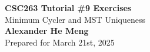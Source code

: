 \begin{titlepage}
    \null %
    \vfill
    \begin{center}
        {\fontsize{35}{48}\selectfont \bfseries CSC263 Tutorial \#9 Exercises}
        \vspace{20pt} \\
        {\LARGE Minimum Cycler and MST Uniqueness} \\
        \vspace{20pt}
        \textbf{Alexander He Meng}
        \vspace{8pt}
        \\ Prepared for March 21st, 2025
    \end{center}
    \vfill
\end{titlepage}
